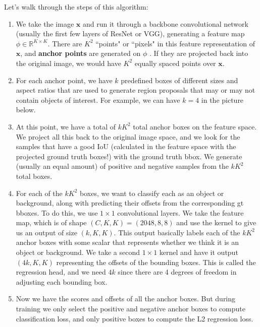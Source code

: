 \documentclass{article}
\begin{document}
    Let's walk through the steps of this algorithm: 
    \begin{enumerate}
        \item We take the image $\mathbf{x}$ and run it through a backbone convolutional network (usually the first few layers of ResNet or VGG), generating a feature map $\phi \in \mathbb{R}^{K \times K}$. There are $K^2$ ``points" or ``pixels" in this feature representation of $\mathbf{x}$, and \textbf{anchor points} are generated on $\phi$ . If they are projected back into the original image, we would have $K^2$ equally spaced points over $\mathbf{x}$. 
            \begin{center}
            \end{center}
        \item For each anchor point, we have $k$ predefined boxes of different sizes and aspect ratios that are used to generate region proposals that may or may not contain objects of interest. For example, we can have $k = 4$ in the picture below. 
        \begin{center}
        \end{center}
        \item At this point, we have a total of $k K^2$ total anchor boxes on the feature space. We project all this back to the original image space, and we look for the samples that have a good IoU (calculated in the feature space with the projected ground truth boxes!) with the ground truth bbox. We generate (usually an equal amount) of positive and negative samples from the $k K^2$ total boxes. 
        
        \item For each of the $k K^2$ boxes, we want to classify each as an object or background, along with predicting their offsets from the corresponding gt bboxes. To do this, we use $1 \times 1$ convolutional layers. We take the feature map, which is of shape $(C, K, K) = (2048, 8, 8)$ and use the kernel to give us an output of size $(k, K, K)$. This output basically labels each of the $k K^2$ anchor boxes with some scalar that represents whether we think it is an object or background. We take a second $1 \times 1$ kernel and have it output $(4k, K, K)$ representing the offsets of the bounding boxes. This is called the regression head, and we need $4k$ since there are 4 degrees of freedom in adjusting each bounding box. 
        
        \item Now we have the scores and offsets of all the anchor boxes. But during training we only select the positive and negative anchor boxes to compute classification loss, and only positive boxes to compute the L2 regression loss. 


\end{enumerate}
\end{document}
